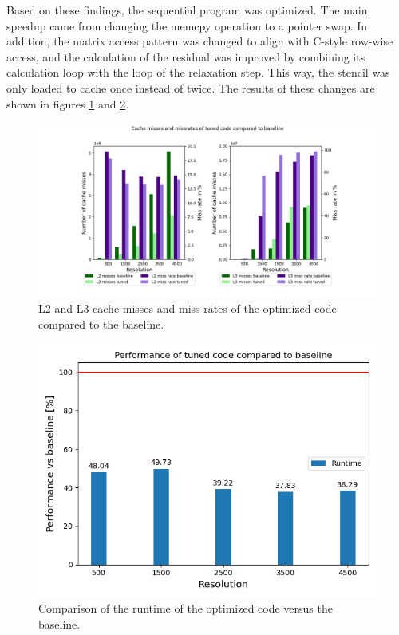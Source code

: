 Based on these findings, the sequential program was optimized. The main speedup came from changing the memcpy operation to a pointer swap. In addition, the matrix access pattern was changed to align with C-style row-wise access, and the calculation of the residual was improved by combining its calculation loop with the loop of the relaxation step. This way, the stencil was only loaded to cache once instead of twice. The results of these changes are shown in figures \ref{fig:L2L3} and \ref{fig:runtimeL2L3}.

\begin{figure}[h]
    \centering
    \includegraphics[scale=0.55]{figures/L2L3_and_rates.png}
    \caption{L2 and L3 cache misses and miss rates of the optimized code compared to the baseline.}
    \label{fig:L2L3}
\end{figure}

\begin{figure}[h]
    \centering
    \includegraphics[scale=0.5]{figures/runtime_prof.png}
    \caption{Comparison of the runtime of the optimized code versus the baseline.}
    \label{fig:runtimeL2L3}
\end{figure}

